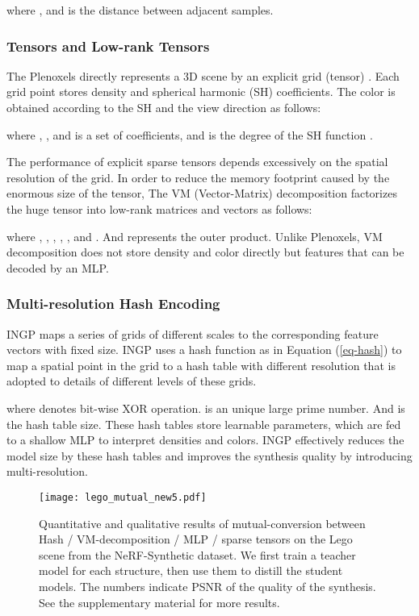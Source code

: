 \documentclass[letterpaper]{article} \usepackage{aaai23}  \usepackage{times}  \usepackage{helvet}  \usepackage{courier}  \usepackage[hyphens]{url}  \usepackage{graphicx} \urlstyle{rm} \def\UrlFont{\rm}  \usepackage{natbib}  \usepackage{caption} \frenchspacing  \setlength{\pdfpagewidth}{8.5in}  \setlength{\pdfpageheight}{11in}  \usepackage{multirow}
\begin{document}
where , and  is the distance between adjacent samples. 


\subsubsection{Tensors and Low-rank Tensors} The Plenoxels directly represents a 3D scene by an explicit grid (tensor) \cite{fridovich2022plenoxels}. Each grid point stores density and spherical harmonic (SH) coefficients. The color  is obtained according to the SH and the view direction  as follows:

where , ,  and  is a set of coefficients, and  is the degree of the SH function .


The performance of explicit sparse tensors depends excessively on the spatial resolution of the grid. In order to reduce the memory footprint caused by the enormous size of the tensor, The VM (Vector-Matrix) \cite{chen2022tensorf} decomposition factorizes the huge tensor  into low-rank matrices  and vectors  as follows:

where , , , , , and . And  represents the outer product. Unlike Plenoxels, VM decomposition does not store density and color directly but features that can be decoded by an MLP.

\subsubsection{Multi-resolution Hash Encoding}INGP \cite{muller2022instant} maps a series of grids of different scales to the corresponding feature vectors with fixed size. INGP uses a hash function as in Equation (\ref{eq-hash}) to map a spatial point in the grid to a hash table with different resolution that is adopted to details of different levels of these grids.

where  denotes bit-wise XOR operation.  is an unique large prime number. And  is the hash table size. These hash tables store learnable parameters, which are fed to a shallow MLP to interpret densities and colors. INGP effectively reduces the model size by these hash tables and improves the synthesis quality by introducing multi-resolution.


\begin{figure*}[t]
\centering
\texttt{[image: lego\_mutual\_new5.pdf]} \caption{Quantitative and qualitative results of mutual-conversion between Hash / VM-decomposition / MLP / sparse tensors on the Lego scene from the NeRF-Synthetic dataset. We first train a teacher model for each structure, then use them to distill the student models. The numbers indicate PSNR of the quality of the synthesis. See the supplementary material for more results.}
\label{fig-mutual}
\end{figure*}
\end{document}
